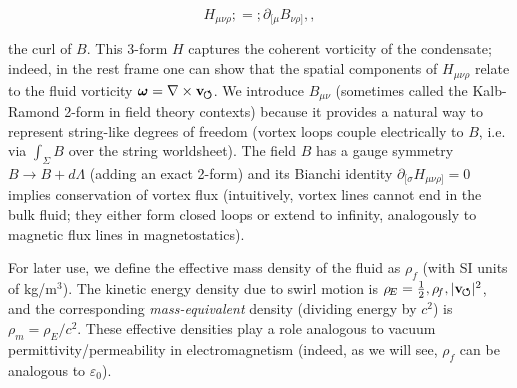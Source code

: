 \documentclass[10pt,reprint,aps,onecolumn,nofootinbib]{revtex4-2}
\newcommand{\swirlarrow}{%
    \mathchoice{\mkern-2mu\scriptstyle\boldsymbol{\circlearrowleft}}%
    {\mkern-2mu\scriptstyle\boldsymbol{\circlearrowleft}}%
    {\mkern-2mu\scriptstyle\boldsymbol{\circlearrowleft}}%
    {\mkern-2mu\scriptscriptstyle\boldsymbol{\circlearrowleft}}%
}
\newcommand{\vswirl}{\mathbf{v}_{\swirlarrow}}
\newcommand{\rhoE}{\rho_{\!E}}                           %
\newcommand{\rhoF}{\rho_{\!f}}     %
\newcommand{\rhoM}{\rho_{\!m}}     %
\begin{document}
\begin{equation}

H_{\mu\nu\rho} ;=; \partial_{[\mu} B_{\nu\rho]},,

\end{equation}

the curl of $B$. This 3-form $H$ captures the coherent vorticity of the condensate; indeed, in the rest frame one can show that the spatial components of $H_{\mu\nu\rho}$ relate to the fluid vorticity $\bm{\omega} = \nabla \times \vswirl$. We introduce $B_{\mu\nu}$ (sometimes called the Kalb-Ramond 2-form in field theory contexts) because it provides a natural way to represent string-like degrees of freedom (vortex loops couple electrically to $B$, i.e. via $\int_{\Sigma} B$ over the string worldsheet). The field $B$ has a gauge symmetry $B \to B + d\Lambda$ (adding an exact 2-form) and its Bianchi identity $\partial_{[\sigma} H_{\mu\nu\rho]}=0$ implies conservation of vortex flux (intuitively, vortex lines cannot end in the bulk fluid; they either form closed loops or extend to infinity, analogously to magnetic flux lines in magnetostatics).


For later use, we define the effective mass density of the fluid as $\rhoF$ (with SI units of kg/m$^3$). The kinetic energy density due to swirl motion is $\rhoE = \tfrac{1}{2},\rhoF,|\vswirl|^2$, and the corresponding \emph{mass-equivalent} density (dividing energy by $c^2$) is $\rhoM = \rhoE/c^2$. These effective densities play a role analogous to vacuum permittivity/permeability in electromagnetism (indeed, as we will see, $\rhoF$ can be analogous to $\varepsilon_0$).
\end{document}
